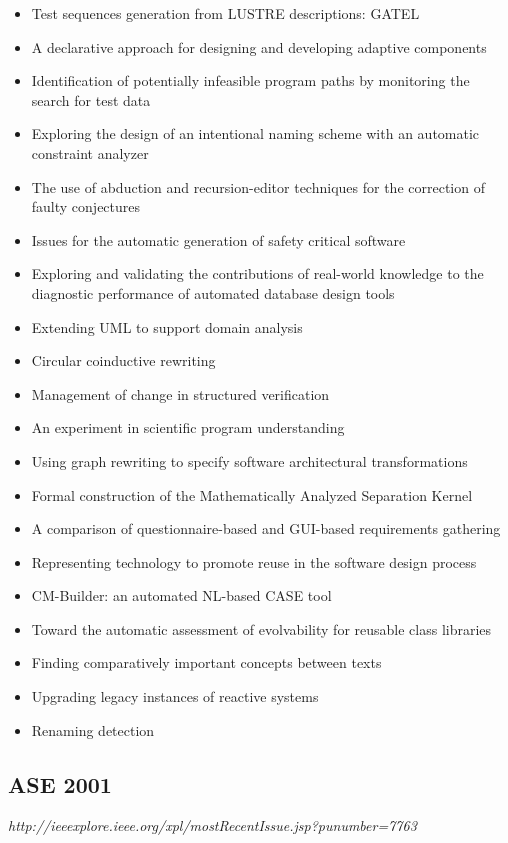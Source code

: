 {\begin{itemize}[itemsep=-1ex]
  \item Test sequences generation from LUSTRE descriptions: GATEL
  \item A declarative approach for designing and developing adaptive components
  \item Identification of potentially infeasible program paths by monitoring the search for test data
  \item Exploring the design of an intentional naming scheme with an automatic constraint analyzer
  \item The use of abduction and recursion-editor techniques for the correction of faulty conjectures
  \item Issues for the automatic generation of safety critical software
  \item Exploring and validating the contributions of real-world knowledge to the diagnostic performance of automated database design tools
  \item Extending UML to support domain analysis
  \item Circular coinductive rewriting
  \item Management of change in structured verification
  \item An experiment in scientific program understanding
  \item Using graph rewriting to specify software architectural transformations
  \item Formal construction of the Mathematically Analyzed Separation Kernel
  \item A comparison of questionnaire-based and GUI-based requirements gathering
  \item Representing technology to promote reuse in the software design process
  \item CM-Builder: an automated NL-based CASE tool
  \item Toward the automatic assessment of evolvability for reusable class libraries
  \item Finding comparatively important concepts between texts
  \item Upgrading legacy instances of reactive systems
  \item Renaming detection 
\end{itemize}
}

\subsection{ASE 2001}

{\small \em http://ieeexplore.ieee.org/xpl/mostRecentIssue.jsp?punumber=7763}

